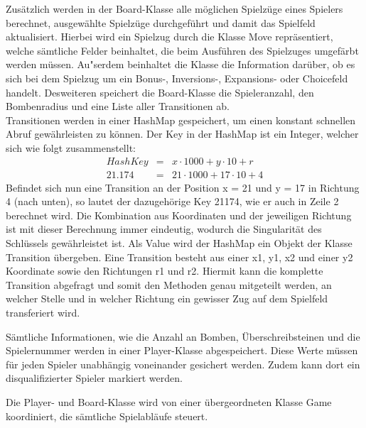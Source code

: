 Zus\"atzlich werden in der Board-Klasse alle m\"oglichen Spielz\"uge eines Spielers berechnet, ausgew\"ahlte Spielz\"uge durchgef\"uhrt und damit das Spielfeld aktualisiert.
Hierbei wird ein Spielzug durch die Klasse Move repr\"asentiert, welche s\"amtliche Felder beinhaltet, die beim Ausf\"uhren des Spielzuges umgef\"arbt werden m\"ussen.
Au"serdem beinhaltet die Klasse die Information dar\"uber, ob es sich bei dem Spielzug um ein Bonus-, Inversions-, Expansions- oder Choicefeld handelt.
Desweiteren speichert die Board-Klasse die Spieleranzahl, den Bombenradius und eine Liste aller Transitionen ab. \\
Transitionen werden in einer HashMap gespeichert, um einen konstant schnellen Abruf gew\"ahrleisten zu k\"onnen.
Der Key in der HashMap ist ein Integer, welcher sich wie folgt zusammenstellt:
\begin{align}
    HashKey &=& x \cdot 1000 + y \cdot 10 + r \\
    21.174 &=& 21 \cdot 1000 + 17 \cdot 10 + 4
\end{align}
Befindet sich nun eine Transition an der Position x = 21 und y = 17 in Richtung 4 (nach unten), so lautet der dazugeh\"orige Key 21174, wie er auch in Zeile 2 berechnet wird.
Die Kombination aus Koordinaten und der jeweiligen Richtung ist mit dieser Berechnung immer eindeutig, wodurch die Singularit\"at des Schl\"ussels gew\"ahrleistet ist.
Als Value wird der HashMap ein Objekt der Klasse Transition \"ubergeben.
Eine Transition besteht aus einer x1, y1, x2 und einer y2 Koordinate sowie den Richtungen r1 und r2.
Hiermit kann die komplette Transition abgefragt und somit den Methoden genau mitgeteilt werden, an welcher Stelle und in welcher Richtung ein gewisser Zug auf dem Spielfeld transferiert wird.

S\"amtliche Informationen, wie die Anzahl an Bomben, \"Uberschreibsteinen und die Spielernummer werden in einer Player-Klasse abgespeichert.
Diese Werte m\"ussen f\"ur jeden Spieler unabh\"angig voneinander gesichert werden.
Zudem kann dort ein disqualifizierter Spieler markiert werden.

Die Player- und Board-Klasse wird von einer \"ubergeordneten Klasse Game koordiniert, die s\"amtliche Spielabl\"aufe steuert.


\bigskip
\newpage